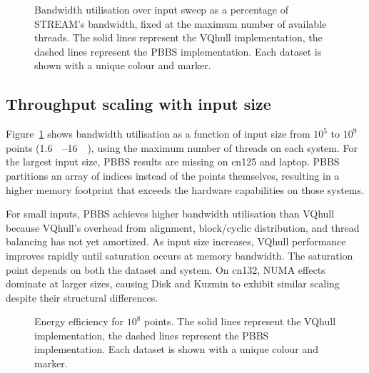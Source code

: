 \documentclass[11pt,a4paper]{article}
\begin{document}
\begin{figure}[t]
  \begin{subfigure}[b]{0.33\linewidth}
    \centering
  \end{subfigure}%
  \hfill
  \begin{subfigure}[b]{0.33\linewidth}
    \centering
  \end{subfigure}%
  \hfill
  \begin{subfigure}[b]{0.33\linewidth}
    \centering
  \end{subfigure}%
  \caption{Bandwidth utilisation over input sweep as a percentage of STREAM's bandwidth, fixed at the maximum number of available threads.
  The solid lines represent the VQhull implementation, the dashed lines represent the PBBS implementation.
  Each dataset is shown with a unique colour and marker.}%
  \label{fig:points}%
\end{figure}

\subsection{Throughput scaling with input size}
Figure~\ref{fig:points} shows bandwidth utilisation as a function of input size from $10^5$ to $10^9$ points (\qty{1.6}{\mega\byte}--\qty{16}{\giga\byte}), using the maximum number of threads on each system.
For the largest input size, PBBS results are missing on cn125 and laptop.
PBBS partitions an array of indices instead of the points themselves, resulting in a higher memory footprint that exceeds the hardware capabilities on those systems.

For small inputs, PBBS achieves higher bandwidth utilisation than VQhull because VQhull's overhead from alignment, block\-/cyclic distribution, and thread balancing has not yet amortized.
As input size increases, VQhull performance improves rapidly until saturation occurs at memory bandwidth.
The saturation point depends on both the dataset and system.
On cn132, NUMA effects dominate at larger sizes, causing Disk and Kuzmin to exhibit similar scaling despite their structural differences.

\begin{figure}[t]
  \begin{subfigure}[b]{0.33\linewidth}
    \centering
  \end{subfigure}%
  \hfill
  \begin{subfigure}[b]{0.33\linewidth}
    \centering
  \end{subfigure}%
  \hfill
  \begin{subfigure}[b]{0.33\linewidth}
    \centering
  \end{subfigure}%
  \caption{Energy efficiency for $10^8$ points.
  The solid lines represent the VQhull implementation, the dashed lines represent the PBBS implementation.
  Each dataset is shown with a unique colour and marker.}%
  \label{fig:energy}%
\end{figure}
\end{document}
